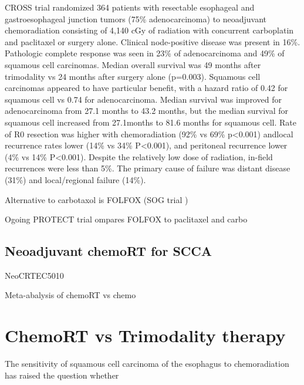 \documentclass[
]{book}
\begin{document}
CROSS trial randomized 364 patients with resectable esophageal and gastroesophageal junction tumors (75\% adenocarcinoma) to neoadjuvant chemoradiation consisting of 4,140 cGy of radiation with concurrent carboplatin and paclitaxel or surgery alone.\citep{vanhagen2074} Clinical node-positive disease was present in 16\%. Pathologic complete response was seen in 23\% of adenocarcinoma and 49\% of squamous cell carcinomas. Median overall survival was 49 months after trimodality vs 24 months after surgery alone (p=0.003). Squamous cell carcinomas appeared to have particular benefit, with a hazard ratio of 0.42 for squamous cell vs 0.74 for adenocarcinoma. Median survival was improved for adenocarcinoma from 27.1 months to 43.2 months, but the median survival for squamous cell increased from 27.1months to 81.6 months for squamous cell. Rate of R0 resection was higher with chemoradiation (92\% vs 69\% p\textless0.001) andlocal recurrence rates lower (14\% vs 34\% P\textless0.001), and peritoneal recurrence lower (4\% vs 14\% P\textless0.001). Despite the relatively low dose of radiation, in-field recurrences were less than 5\%. The primary cause of failure was distant disease (31\%) and local/regional failure (14\%).\citep{oppedijk385}

Alternative to carbotaxol is FOLFOX (SOG trial \citep{leichman4555})

Ogoing PROTECT trial ompares FOLFOX to paclitaxel and carbo \citep{messager318}

\hypertarget{neoadjuvant-chemort-for-scca}{%
\subsection{Neoadjuvant chemoRT for SCCA}\label{neoadjuvant-chemort-for-scca}}

NeoCRTEC5010 \citep{yang2796}

Meta-abalysis of chemoRT vs chemo \citep{zhaoe0202185}

\hypertarget{chemort-vs-trimodality-therapy}{%
\section{ChemoRT vs Trimodality therapy}\label{chemort-vs-trimodality-therapy}}

The sensitivity of squamous cell carcinoma of the esophagus to chemoradiation has raised the question whether
\end{document}
